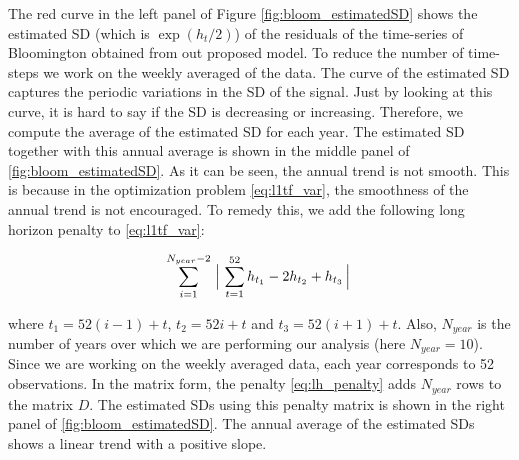\documentclass{article}
\begin{document}
The red curve in the left panel of Figure \autoref{fig:bloom_estimatedSD}
shows the estimated SD (which is $\exp(h_t/2)$) of the residuals of
the time-series of Bloomington obtained from out proposed model. To reduce the number of time-steps we work on the weekly averaged of the data. The curve of the estimated SD captures the periodic variations in the
SD of the signal. Just by looking at this curve, it is hard to say if
the SD is decreasing or increasing. Therefore, we compute the average
of the estimated SD for each year. The estimated SD together with this
annual average is shown in the middle panel of
\autoref{fig:bloom_estimatedSD}. As it can be seen, the annual trend
is not smooth. This is because in the optimization problem
\eqref{eq:l1tf_var}, the smoothness of the annual trend is not
encouraged. To remedy this, we add the following long horizon penalty to \eqref{eq:l1tf_var}:
 
\begin{equation}
\sum_{i=1}^{N_{year}-2} \Big\arrowvert \sum_{t=1}^{52} h_{t_1}-2h_{t_2}+h_{t_3}  \Big\arrowvert
\label{eq:lh_penalty}
\end{equation}

where $t_1=52(i-1)+t$, $t_2=52i+t$ and $t_3=52(i+1)+t$. Also,
$N_{year}$ is the number of years over which we are performing our
analysis (here $N_{year}=10$). Since we are working on the weekly
averaged data, each year corresponds to 52 observations. In the matrix
form, the penalty \eqref{eq:lh_penalty} adds $N_{year}$ rows to the
matrix $D$. The estimated SDs using this penalty matrix is shown in
the right panel of \autoref{fig:bloom_estimatedSD}. The annual average
of the estimated SDs shows a linear trend with a positive slope. 


\small

\end{document}
